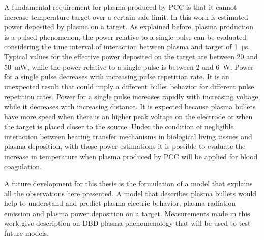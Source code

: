 A fundamental requirement for plasma produced by PCC is that it cannot increase temperature target over a certain safe limit. In this work is estimated power deposited by plasma on a target. As explained before, plasma production is a pulsed phenomenon, the power relative to a single pulse can be evaluated considering the time interval of interaction between plasma and target of \SI{1}{\micro\second}.
Typical values for the effective power deposited on the target are between \num{20} and \SI{50}{\milli\watt}, while the power relative to a single pulse is between \num{2} and \SI{6}{\watt}.
Power for a single pulse decreases with increasing pulse repetition rate. It is an unexpected result that could imply a different bullet behavior for different pulse repetition rates.
Power for a single pulse increases rapidly with increasing voltage, while it decreases with increasing distance. It is expected because plasma bullets have more speed when there is an higher peak voltage on the electrode or when the target is placed closer to the source.
Under the condition of negligible interaction between heating transfer mechanisms in biological living tissues and plasma deposition, with those power estimations it is possible to evaluate the increase in temperature when plasma produced by PCC will be applied for blood coagulation.


A future development for this thesis is the formulation of a model that explains all the observations here presented. A model that describes plasma bullets would help to understand and predict plasma electric behavior, plasma radiation emission and plasma power deposition on a target. Measurements made in this work give description on DBD plasma phenomenology that will be used to test future models.
